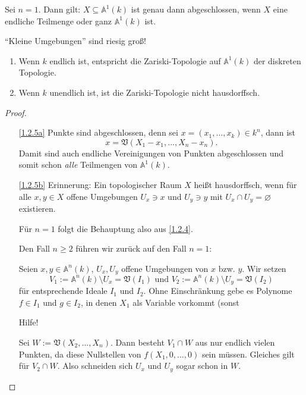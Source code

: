 \documentclass[a4paper,12pt]{scrbook}
\newtheorem{proof}{Beweis}
\def\A{\mathbb{A}}
\def\V{\mathfrak{V}}
\newcommand{\leer}{\ensuremath{\varnothing}}
\renewcommand{\dotsc}{\ensuremath{\!...}}
\begin{document}
\begin{bsp}\label{1.2.4}
Sei $n=1$. Dann gilt: $X\subseteq\A^{1}(k)$ ist genau dann abgeschlossen, wenn $X$ eine endliche Teilmenge oder ganz $\A^{1}(k)$ ist.
\end{bsp}

\begin{w}\enquote{Kleine Umgebungen} sind riesig groß!\end{w}

\begin{bem}\label{1.2.5}
\begin{enumerate}
\item{} Wenn $k$ endlich ist, entspricht die Zariski-Topologie auf $\A^{1}(k)$ der diskreten Topologie.
\item{} Wenn $k$ unendlich ist, ist die Zariski-Topologie nicht hausdorffsch.
\end{enumerate}\end{bem}
\begin{proof}\begin{enumerate}
\item[\ref{1.2.5a}] Punkte sind abgeschlossen, denn sei $x=(x_{1},\dotsc,x_{k})\in k^{n}$, dann ist
\[{x}=\V(X_{1}-x_{1},\dotsc,X_{n}-x_{n}).\]
Damit sind auch endliche Vereinigungen von Punkten abgeschlossen und somit schon \emph{alle} Teilmengen von $\A^{1}(k)$.
\item[\ref{1.2.5b}] {\sc Erinnerung:} Ein topologischer Raum $X$ heißt hausdorffsch, wenn für alle $x,y\in X$ offene Umgebungen $U_{x}\ni x$ und $U_{y}\ni y$ mit $U_{x}\cap U_{y}=\leer$ existieren.

Für $n=1$ folgt die Behauptung also aus \cref{1.2.4}.

Den Fall $n\geq 2$ führen wir zurück auf den Fall $n=1$:

Seien $x,y\in\A^{n}(k)$, $U_{x},U_{y}$ offene Umgebungen von $x$ bzw. $y$. Wir setzen
\[V_{1}:=\A^{n}(k)\setminus U_{x} = \V(I_{1})\text{ und }V_{2}:=\A^{n}(k)\setminus U_{y}=\V(I_{2})\]
für entsprechende Ideale $I_{1}$ und $I_{2}$. Ohne Einschränkung gebe es Polynome $f\in I_{1}$ und $g\in I_{2}$, in denen $X_{1}$ als Variable vorkommt (sonst

\begin{w}Hilfe!\end{w}

Sei $W:=\V(X_{2},\dotsc,X_{n})$. Dann besteht $V_{1}\cap W$ aus nur endlich vielen Punkten, da diese Nullstellen von $f(X_{1},0,\dotsc,0)$ sein müssen. Gleiches gilt für $V_{2}\cap W$. Also schneiden sich $U_{x}$ und $U_{y}$ sogar schon in $W$.
\end{enumerate}\end{proof}
\end{document}
